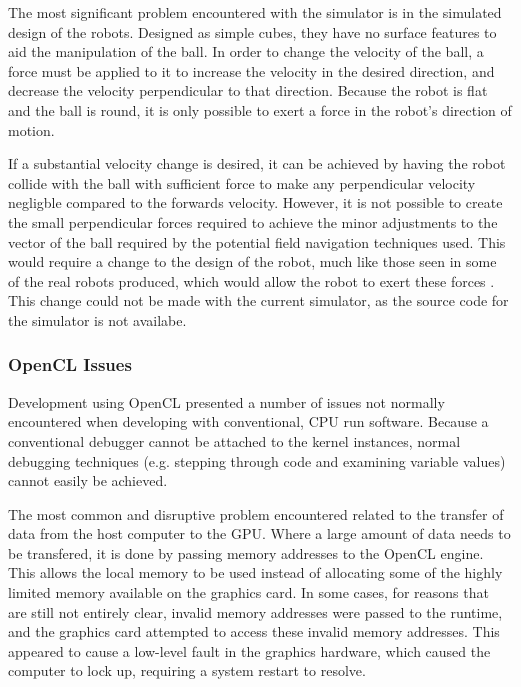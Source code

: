 \documentclass[10pt]{article}
\begin{document}
The most significant problem encountered with the simulator is in the simulated
design of the robots.  Designed as simple cubes, they have no surface features
to aid the manipulation of the ball.  In order to change the velocity of the
ball, a force must be applied to it to increase the velocity in the desired
direction, and decrease the velocity perpendicular to that direction.  Because
the robot is flat and the ball is round, it is only possible to exert a force in
the robot's direction of motion.

If a substantial velocity change is desired, it can be achieved by having the
robot collide with the ball with sufficient force to make any perpendicular
velocity negligble compared to the forwards velocity.  However, it is not
possible to create the small perpendicular forces required to achieve the minor
adjustments to the vector of the ball required by the potential field navigation
techniques used. This would require a change to the design of the robot, much
like those seen in some of the real robots produced, which would allow the robot
to exert these forces \cite{aSuitablePaper}.  This change could not be made with
the current simulator, as the source code for the simulator is not availabe.

\subsubsection{OpenCL Issues}

Development using OpenCL presented a number of issues not normally encountered
when developing with conventional, CPU run software.  Because a
conventional debugger cannot be attached to the kernel instances, normal
debugging techniques (e.g. stepping through code and examining variable values)
cannot easily be achieved.

The most common and disruptive problem encountered related to the transfer of
data from the host computer to the GPU.  Where a large amount of data needs
to be transfered, it is done by passing memory addresses to the OpenCL engine. 
This allows the local memory to be used instead of allocating some of the highly
limited memory available on the graphics card.  In some cases, for reasons that
are still not entirely clear, invalid memory addresses were passed to the
runtime, and the graphics card attempted to access these invalid memory
addresses.  This appeared to cause a low-level fault in the graphics hardware,
which caused the computer to lock up, requiring a system restart to resolve.
\end{document}
